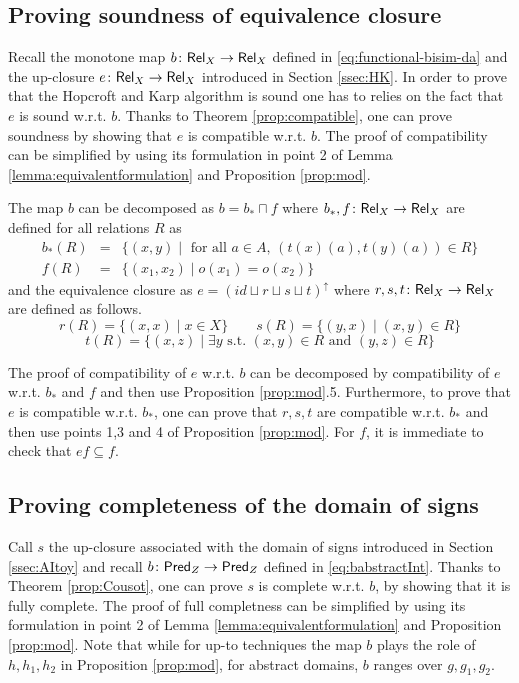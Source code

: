 \documentclass{llncs}
\begin{document}
 
 
 \subsection{Proving soundness of equivalence closure}\label{sec:HKsoundness}

 
 
 
 Recall the monotone map $b\colon \mathsf{Rel}_X \to \mathsf{Rel}_X$ defined in \eqref{eq:functional-bisim-da} and the up-closure $e\colon \mathsf{Rel}_X \to \mathsf{Rel}_X$ introduced in Section \ref{ssec:HK}.
 In order to prove that the Hopcroft and Karp algorithm is sound one has to relies on the fact that $e$ is sound w.r.t. $b$. 
 Thanks to Theorem \ref{prop:compatible}, one can prove soundness by showing that $e$ is compatible w.r.t. $b$. The proof of compatibility can be simplified by using its formulation in point 2 of Lemma \ref{lemma:equivalentformulation} and Proposition \ref{prop:mod}.

The map $b$ can be decomposed as $b = b_* \sqcap f$ where $b_*,f \colon \mathsf{Rel}_X\to  \mathsf{Rel}_X$ are defined for all relations $R$ as
\begin{equation}
\begin{array}{rcl}
b_*(R) & =& \{(x,y) \mid \text{ for all } a\in A, \, (t(x)(a), t(y)(a))\in R  \} \\ 
f(R) & = & \{(x_1,x_2)  \mid o(x_1)=o(x_2) \}
\end{array}
\end{equation}
and the equivalence closure as $e= (id\sqcup r \sqcup s \sqcup t )^\uparrow$ where 
$r,s,t\colon \mathsf{Rel}_X \to \mathsf{Rel}_X$ are defined as follows.
$$r(R) = \{(x,x)\mid x\in X \} \qquad s(R)=\{(y,x)\mid (x,y)\in R\}$$ 
$$t(R)=\{(x,z) \mid \exists y \text{ s.t. } (x,y) \in R \text{ and } (y,z)\in R\} $$

The proof of  compatibility of $e$ w.r.t. $b$ can be decomposed by compatibility of $e$ w.r.t. $b_*$ and $f$ and then use Proposition  \ref{prop:mod}.5. Furthermore, to prove that $e$ is compatible w.r.t. $b_*$, one can prove that $r,s,t$ are compatible w.r.t. $b_*$ and then use points 1,3 and 4 of Proposition  \ref{prop:mod}. For $f$, it is immediate to check that $ef\subseteq f$. 

\subsection{Proving completeness of the domain of signs}\label{sec:Signcomplete}
Call $s$ the up-closure associated with the domain of signs introduced in Section \ref{ssec:AItoy} and recall $b\colon \mathsf{Pred}_Z \to \mathsf{Pred}_Z$ defined in \eqref{eq:babstractInt}. Thanks to Theorem \ref{prop:Cousot}, one can prove $s$ is complete w.r.t. $b$, by showing that it is fully complete. The proof of full completness can be simplified by using its formulation in point 2 of Lemma \ref{lemma:equivalentformulation} and Proposition \ref{prop:mod}. Note that while for up-to techniques the map $b$ plays the role of $h,h_1,h_2$ in Proposition \ref{prop:mod}, for abstract domains, $b$ ranges over $g,g_1,g_2$.
\end{document}
